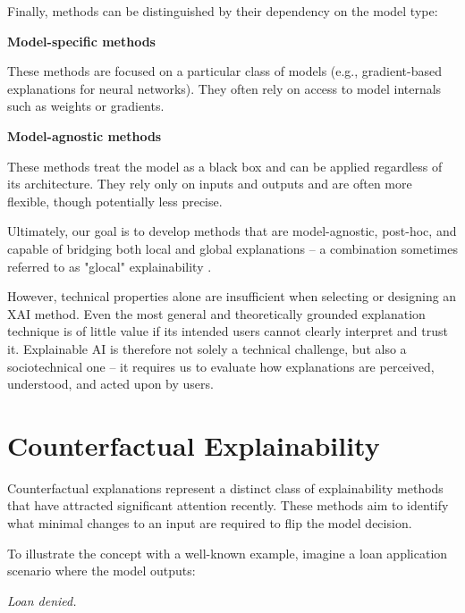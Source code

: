\newpage

Finally, methods can be distinguished by their dependency on the model type:

\begin{multicols}{2}
    \centering \textbf{Model-specific methods} \\[4pt]
    \raggedright
    These methods are focused on a particular class of models (e.g., gradient-based explanations for neural networks).
    They often rely on access to model internals such as weights or gradients.

    \columnbreak

    \centering \textbf{Model-agnostic methods} \\[4pt]
    \raggedright
    These methods treat the model as a black box and can be applied regardless of its architecture.
    They rely only on inputs and outputs and are often more flexible, though potentially less precise.
\end{multicols}

Ultimately, our goal is to develop methods that are model-agnostic, post-hoc, and capable of bridging both local and
global explanations -- a combination sometimes referred to as "glocal" explainability \cite{achtibat2023attribution}.

However, technical properties alone are insufficient when selecting or designing an XAI method.
Even the most general and theoretically grounded explanation technique is of little value if its intended users cannot clearly interpret and trust it.
Explainable AI is therefore not solely a technical challenge, but also a sociotechnical one -- it requires us to evaluate how explanations are perceived,
understood, and acted upon by users.


\section{Counterfactual Explainability}

Counterfactual explanations represent a distinct class of explainability methods that have attracted significant attention recently.
These methods aim to identify what minimal changes to an input are required to flip the model decision.

To illustrate the concept with a well-known example, imagine a loan application scenario where the model outputs:

\begin{center}
    \textit{Loan denied.}
\end{center}

